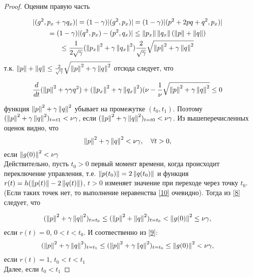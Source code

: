 \begin{proof}
    Оценим правую часть 

    \begin{gather*}
        |(g^2, p_x + \gamma q_x)| = (1 - \gamma)|(g^2, p_x)| = (1 - \gamma)|(p^2
        + 2pq + q^2, p_x)| \\*
        = (1 - \gamma)|(q^2, p_x) - (p^2, q_x)| \le \left\lVert p_x\right\rVert \left\lVert q_x\right\rVert
        (\left\lVert p\right\rVert + \left\lVert q\right\rVert) \\* \le
        \frac{1}{2\sqrt{\gamma}}(\left\lVert p_x\right\rVert^2 + \gamma \left\lVert q_x\right\rVert^2)
        \frac{2}{\sqrt{\gamma}}\sqrt{\left\lVert p\right\rVert^2 + \gamma \left\lVert q\right\rVert^2}
    \end{gather*}
    т.к. $\left\lVert p\right\rVert + \left\lVert q\right\rVert \le \frac{2}{\sqrt{\gamma}}\sqrt{\left\lVert p\right\rVert^2 +
        \gamma \left\lVert q\right\rVert^2}$ отсюда следует, что

    \begin{equation}
        \frac{d}{dt}(\left\lVert p\right\rVert^2 + \gamma \gamma{q}^2) + (\left\lVert p_x\right\rVert^2 + \gamma
        \left\lVert q_x\right\rVert^2) (\nu - \frac{1}{\nu} \sqrt{\left\lVert p\right\rVert^2 + \gamma \left\lVert q\right\rVert^2}
        \le 0
    \end{equation}

    функция $\left\lVert p\right\rVert^2 + \gamma \left\lVert q\right\rVert^2$ убывает на промежутке $(t_0, t_1)$.
    Поэтому $(\left\lVert p\right\rVert^2 + \gamma \left\lVert q\right\rVert^2)_{t=t1} < \nu \gamma$, если 
    $(\left\lVert p\right\rVert^2 + \gamma \left\lVert q\right\rVert^2)_{t=t0} < \nu \gamma$. Из вышеперечисленных
    оценок видно, что 
    \begin{equation}\label{10}
        \left\lVert p\right\rVert^2 + \gamma \left\lVert q\right\rVert^2 < \nu \gamma, \quad \forall t > 0,
    \end{equation}
    если $\left\lVert g(0)\right\rVert^2 < \nu \gamma$\\

    Действительно, пусть $t_0 > 0$ первый момент времени, когда происходит
    переключение управления, т.е. $\left\lVert p(t_0)\right\rVert = 2\left\lVert q(t_0)\right\rVert$ и функция
    $r(t) = h(\left\lVert p(t)\right\rVert - 2 \left\lVert q(t)\right\rVert)$, $t > 0$ изменяет значение при
    переходе через точку $t_0$. (Если таких точек нет, то выполнение неравенства
    \eqref{10} очевидно). Тогда из \eqref{8} следует, что 
    
    \begin{gather*}
        (\left\lVert p\right\rVert^2 + \gamma \left\lVert q\right\rVert^2)_{t = t_0} \le (\left\lVert p\right\rVert^2 +
        \left\lVert q\right\rVert^2)_{t = t_0} < \left\lVert g(0)\right\rVert^2 \le \nu \gamma, 
    \end{gather*}
    если $r(t) = 0$, $0 < t < t_0$. И соотвественно из \eqref{9}:
    \begin{gather*}
        (\left\lVert p\right\rVert^2 + \gamma \left\lVert q\right\rVert^2)_{t=t_1} \le (\left\lVert p\right\rVert^2 + \gamma
        \left\lVert q\right\rVert^2)_{t=t_0} \le \left\lVert g(0)\right\rVert^2 < \nu \gamma,
    \end{gather*}
    если $r(t) = 1$, $t_0 < t < t_1$\\
    Далее, если $t_0 < t_1$ 

    
\end{proof}

